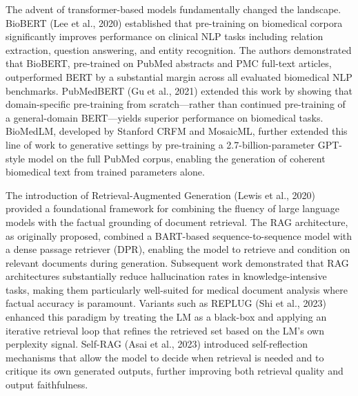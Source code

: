 \documentclass[12pt,a4paper]{report}
\begin{document}
The advent of transformer-based models fundamentally changed the landscape. BioBERT (Lee et al., 2020) established that pre-training on biomedical corpora significantly improves performance on clinical NLP tasks including relation extraction, question answering, and entity recognition. The authors demonstrated that BioBERT, pre-trained on PubMed abstracts and PMC full-text articles, outperformed BERT by a substantial margin across all evaluated biomedical NLP benchmarks. PubMedBERT (Gu et al., 2021) extended this work by showing that domain-specific pre-training from scratch---rather than continued pre-training of a general-domain BERT---yields superior performance on biomedical tasks. BioMedLM, developed by Stanford CRFM and MosaicML, further extended this line of work to generative settings by pre-training a 2.7-billion-parameter GPT-style model on the full PubMed corpus, enabling the generation of coherent biomedical text from trained parameters alone.

The introduction of Retrieval-Augmented Generation (Lewis et al., 2020) provided a foundational framework for combining the fluency of large language models with the factual grounding of document retrieval. The RAG architecture, as originally proposed, combined a BART-based sequence-to-sequence model with a dense passage retriever (DPR), enabling the model to retrieve and condition on relevant documents during generation. Subsequent work demonstrated that RAG architectures substantially reduce hallucination rates in knowledge-intensive tasks, making them particularly well-suited for medical document analysis where factual accuracy is paramount. Variants such as REPLUG (Shi et al., 2023) enhanced this paradigm by treating the LM as a black-box and applying an iterative retrieval loop that refines the retrieved set based on the LM's own perplexity signal. Self-RAG (Asai et al., 2023) introduced self-reflection mechanisms that allow the model to decide when retrieval is needed and to critique its own generated outputs, further improving both retrieval quality and output faithfulness.
\end{document}
